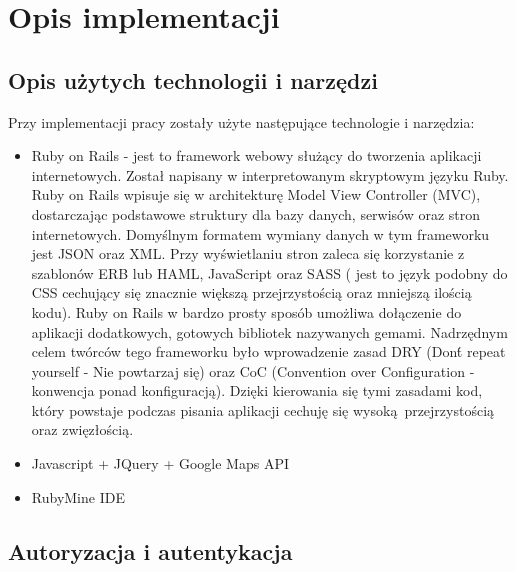 \chapter{Opis implementacji}
\label{cha:uzywaneTechnologie}

\section{Opis użytych technologii i narzędzi}
\label{sec:technology}
Przy implementacji pracy zostały użyte następujące technologie i narzędzia:
\begin{itemize}
\item Ruby on Rails - jest to framework webowy służący do tworzenia aplikacji internetowych. Został napisany w interpretowanym skryptowym języku Ruby. Ruby on Rails wpisuje się w architekturę Model View Controller (MVC), dostarczając podstawowe struktury dla bazy danych, serwisów oraz stron internetowych. Domyślnym formatem wymiany danych w tym frameworku jest JSON oraz XML. Przy wyświetlaniu stron zaleca się korzystanie z szablonów ERB lub HAML, JavaScript oraz SASS ( jest to język podobny do CSS cechujący się znacznie większą przejrzystością oraz mniejszą ilością kodu). Ruby on Rails w bardzo prosty sposób umożliwa dołączenie do aplikacji dodatkowych, gotowych bibliotek nazywanych gemami. Nadrzędnym celem twórców tego frameworku było wprowadzenie zasad DRY (Don\'t repeat yourself - Nie powtarzaj się) oraz CoC (Convention over Configuration - konwencja ponad konfiguracją). Dzięki kierowania się tymi zasadami kod, który powstaje podczas pisania aplikacji cechuję się wysoką przejrzystością oraz zwięzłością.\cite{rails}
\item Javascript + JQuery + Google Maps API
\item RubyMine IDE
\end{itemize}

\section{Autoryzacja i autentykacja}
\label{sec:autoryzacjaAutentykacja}
